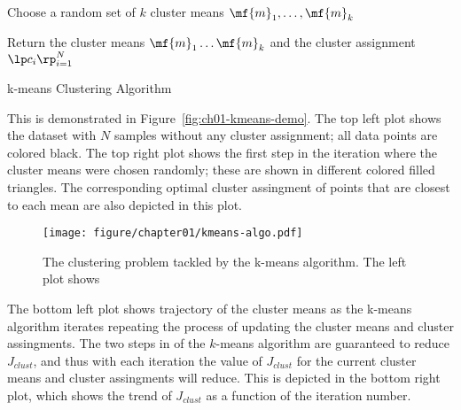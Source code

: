 \begin{boxedstuff}
    \begin{algorithm}[H]
    \SetAlgoLined
    \BlankLine
    Choose a random set of $k$ cluster means $\mf{m}_1,\ldots,\mf{m}_k$\;

    Return the cluster means $\mf{m}_1 \ldots \mf{m}_k$ and the cluster assignment $\lp c_i \rp_{i=1}^N$\;
    \caption{k-means Clustering Algorithm}
    \label{alg:ch01-kmeans}
    \end{algorithm}
\end{boxedstuff}

This is demonstrated in Figure~\ref{fig:ch01-kmeans-demo}. The top left plot shows the dataset with $N$ samples without any cluster assignment; all data points are colored black. The top right plot shows the first step in the iteration where the cluster means were chosen randomly; these are shown in different colored filled triangles. The corresponding optimal cluster assingment of points that are closest to each mean are also depicted in this plot.

\begin{figure}[h]
    \centering
    \texttt{[image: figure/chapter01/kmeans-algo.pdf]}
    \caption{The clustering problem tackled by the k-means algorithm. The left plot shows  }
    \label{fig:ch01-kmeans-algo}
\end{figure}

The bottom left plot shows trajectory of the cluster means as the k-means algorithm iterates repeating the process of updating the cluster means and cluster assingments. The two steps in of the $k$-means algorithm are guaranteed to reduce $J_{clust}$, and thus with each iteration the value of $J_{clust}$ for the current cluster means and cluster assingments will reduce. This is depicted in the bottom right plot, which shows the trend of $J_{clust}$ as a function of the iteration number.

